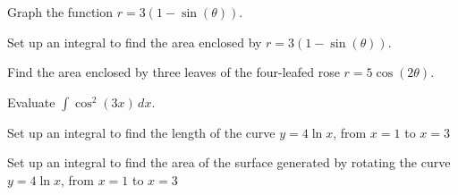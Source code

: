 \documentclass{exam}[12pt]
\begin{document}
\pagestyle{head}

\small{\textit{
}}

\begin{questions}
\large{

\question Graph the function $r=3(1 - \sin(\theta))$.
\vspace{.2in}

\question Set up an integral to find the area enclosed by
 $r=3(1-\sin(\theta))$.
\vspace{.2in}

\question Find the area enclosed by three leaves
of the four-leafed rose $r=5\cos(2\theta)$.
\vspace{.2in}

\question Evaluate $\int \cos^2(3x)\, dx$.
\vspace{.2in}

\question Set up an integral to find the length of the curve $y=4\ln x$, from $x=1$ to $x=3$

\question Set up an integral to find the area of the surface generated by rotating the curve $y=4\ln x$, from $x=1$ to $x=3$


}
\end{questions}
\end{document}
